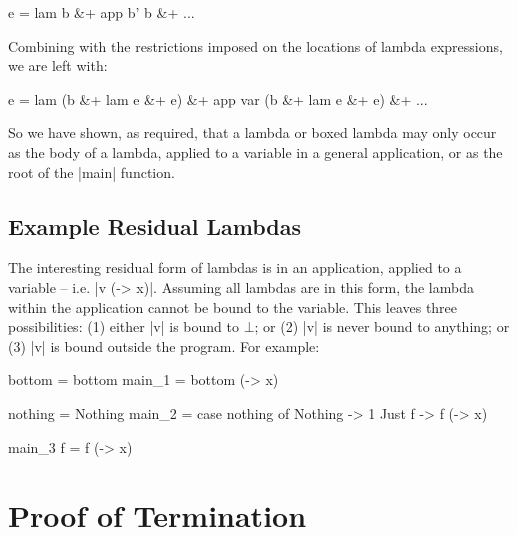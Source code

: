 \ignore\begin{code}
e = lam b &+ app b' b &+ ...
\end{code}

Combining with the restrictions imposed on the locations of lambda expressions, we are left with:

\ignore\begin{code}
e   = lam (b &+ lam e &+ e) &+ app var (b &+ lam e &+ e) &+ ...
\end{code}

So we have shown, as required, that a lambda or boxed lambda may only occur as the body of a lambda, applied to a variable in a general application, or as the root of the |main| function.

\subsection{Example Residual Lambdas}

The interesting residual form of lambdas is in an application, applied to a variable -- i.e. |v (\x -> x)|. Assuming all lambdas are in this form, the lambda within the application cannot be bound to the variable. This leaves three possibilities: (1) either |v| is bound to $\bot{}$; or (2) |v| is never bound to anything; or (3) |v| is bound outside the program. For example:

\begin{code}
bottom = bottom
main_1 = bottom (\x -> x)

nothing = Nothing
main_2 = case  nothing of
               Nothing  -> 1
               Just f   -> f (\x -> x)

main_3 f = f (\x -> x)
\end{code}

\section{Proof of Termination}
\label{secF:termination}

\begin{comment}
We can remove all data types by encoding them as functions, as described in \citet{naylor:reduceron}. If we then had a transformation which made the program first-order \textit{without} introducing any data types, we would end up with a program without data or closures, which is incapable of storing an unbounded amount of information. Since with higher-order functions we can implement a Turing machine \cite{turing:halting}, and without an unbounded store we cannot, such a transformation cannot exist.
\end{comment}

